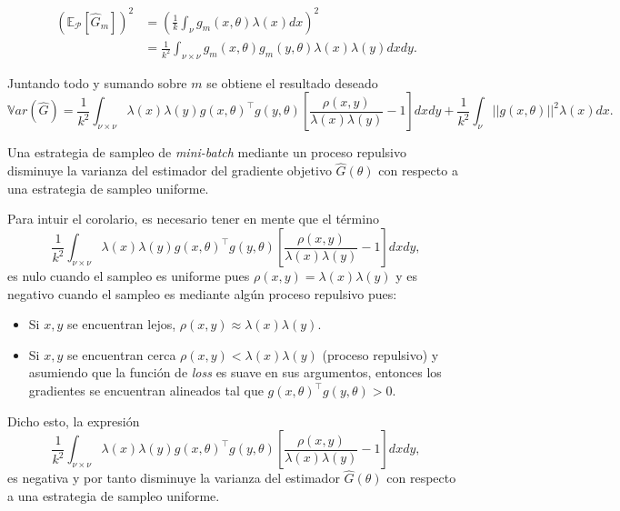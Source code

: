 \begin{appendixs}
    \begin{align*}
    (\mathbb{E}_{\mathcal{P}}[\hat{G}_m])^2 &= \left ( \frac{1}{k} \int_{\nu} g_m(x,\theta)\lambda(x)dx \right )^2 \\
    &= \frac{1}{k^2} \int_{\nu \times \nu}g_m(x,\theta)g_m(y,\theta)\lambda(x)\lambda(y)dxdy .
    \end{align*}
    
 
    \noindent Juntando todo y sumando sobre $m$ se obtiene el resultado deseado 
    \[
         \mathbb{V}ar(\hat{G}) = \frac{1}{k^2}\int_{\nu \times \nu}\lambda(x)\lambda(y)g(x,\theta)^{\top}g(y,\theta)\left [ \frac{\rho(x,y)}{\lambda(x)\lambda(y)} - 1\right ]dxdy
        + \frac{1}{k^2} \int_{\nu} ||g(x,\theta)||^2\lambda(x)dx . 
    \]
    
    \begin{cor}\hypertarget{Corolario B.1}{}
    
    Una estrategia de sampleo de \textit{mini-batch} mediante un proceso repulsivo disminuye la varianza del estimador del gradiente objetivo $\hat{G}(\theta)$ con respecto a una estrategia de sampleo uniforme.
    
    \end{cor}
    
    \vspace{0.2cm}
    
    \noindent Para intuir el corolario, es necesario tener en mente que el término 
    \[
        \frac{1}{k^2}\int_{\nu \times \nu}\lambda(x)\lambda(y)g(x,\theta)^{\top}g(y,\theta)\left [ \frac{\rho(x,y)}{\lambda(x)\lambda(y)} - 1\right ]dxdy , 
    \] es nulo cuando el sampleo es uniforme pues $\rho(x,y) = \lambda(x)\lambda(y)$ y es negativo cuando el sampleo es mediante algún proceso repulsivo pues:
    
    \begin{itemize}
        \item Si $x,y$ se encuentran lejos, $\rho(x,y) \approx \lambda(x)\lambda(y)$.
        \item Si $x,y$ se encuentran cerca $\rho(x,y) < \lambda(x)\lambda(y)$ (proceso repulsivo) y asumiendo que la función de \textit{loss} es suave en sus argumentos, entonces los gradientes se encuentran alineados tal que $g(x,\theta)^{\top}g(y,\theta) > 0$. 
        
    \end{itemize}
    
    \noindent Dicho esto, la expresión
    \[
        \frac{1}{k^2}\int_{\nu \times \nu}\lambda(x)\lambda(y)g(x,\theta)^{\top}g(y,\theta)\left [ \frac{\rho(x,y)}{\lambda(x)\lambda(y)} - 1\right ]dxdy , 
    \]
    es negativa y por tanto disminuye la varianza del estimador $\hat{G}(\theta)$ con respecto a una estrategia de sampleo uniforme. 
  

\end{appendixs}
